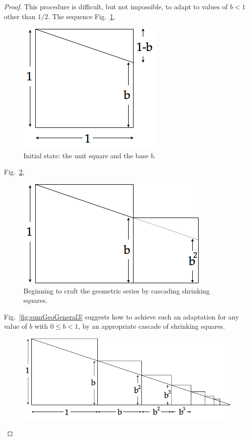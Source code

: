 \begin{proof}
This procedure is difficult, but not impossible, to adapt to values of
$b <1$ other than $1/2$.  The sequence Fig.~\ref{fig:sumGeoGeneral1},
\begin{figure}[ht]
\begin{center}
       \includegraphics[scale=0.4]{FiguresMaths/SumGeometricGeneral1}
\caption{Initial state: the unit square and the base $b$.}
       \label{fig:sumGeoGeneral1}
\end{center}
\end{figure}
Fig.~\ref{fig:sumGeoGeneral2},
\begin{figure}[ht]
\begin{center}
       \includegraphics[scale=0.4]{FiguresMaths/SumGeometricGeneral2}
\caption{Beginning to craft the geometric series by cascading
  shrinking squares.}
       \label{fig:sumGeoGeneral2}
\end{center}
\end{figure}
Fig.~\ref{fig:sumGeoGeneral3} suggests how to achieve such an
adaptation for any value of $b$ with $0 \leq b <1$, by an
appropriate cascade of shrinking squares.
\begin{figure}[ht]
\begin{center}
       \includegraphics[scale=0.4]{FiguresMaths/SumGeometricGeneral3}

\end{center}
\end{figure}
\end{proof}
